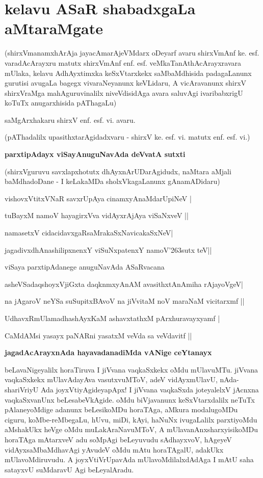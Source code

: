 \setcounter{chapter}{3}
\chapter{kelavu ASaR shabadxgaLa aMtaraMgate}

(shirxVmanamxhArAja jayacAmarAjeVMdarx oDeyarf avaru shirxVmAnf ke. esf. varadAcArayxru matutx shirxVmAnf enf. esf. veMkaTanAthAcArayxravara mUlaka, kelavu AdhAyxtimxka keSxVtarxkekx saMbaMdhisida padagaLanunx gurutisi avugaLa bagegx vivaraNeyanunx keVLidaru, A vicAravanunx shirxV shirxVraMga mahAguruvinalilx niveVdisidAga avara saluvAgi ivaribabxrigU koTuTx anugarxhisida pAThagaLu)

saMgArxhakaru shirxV enf. esf. vi. avaru.

(pAThadalilx upasithxtarAgidadxvaru - shirxV ke. esf. vi. matutx enf. esf. vi.)

\noindent
{\bf\large{parxtipAdayx viSayAnuguNavAda deVvatA sutxti}}\label{page128}

(shirxVguruvu savxlapxhotutx dhAyxnArUDarAgidudx, naMtara aMjali baMdhadoDane - I keLakaMDa sholxVkagaLanunx gAnamADidaru)

\begin{description}
\item[(1)] vishovxVtitxVNaR savxrUpAya cinamxyAnaMdarUpiNeV |\label{128}
\item  tuBayxM namoV hayagirxVva vidAyxrAjAya viSaNxveV ||
\item[(2)] namasetxV cidacidavxgaRsaMrakaSxNavicakaSxNeV|\label{128}
\item  jagadivxdhAnashilipxnenxY viSuNxpatenxY namoV\char'263sutx teV||
\end{description}

viSaya parxtipAdanege anuguNavAda ASaRvacana
\begin{description}
\item[(3)] asheVSadaqshoyxVjiGxta daqknmxyAnAM avasithxtAnAmiha rAjayoVgeV|\label{128}
\item  na jAgaroV neYSa suSupitxBAvoV na jiVvitaM noV maraNaM vicitarxmf ||
\item[(4)] UdhavxRmUlamadhashAyxKaM ashavxtathxM pArxhuravayxyamf |\label{128}
\item  CaMdAMsi yasayx paNARni yasatxM veVda sa veVdavitf ||
\end{description}

\noindent
{\bf\large{jagadAcArayxnAda hayavadanadiMda vANige ceYtanayx}}\label{page128}

beLavaNigeyalilx horaTiruva I jiVvana vaqkaSxkekx oMdu mUlavuMTu. jiVvana vaqkaSxkekx mUlavAdayAva vasutxvuMToV, adeV vidAyxmUlavU, nAda-shariVriyU Ada joyxVtiyAgideyapApx! I jiVvana vaqkaSxda joteyalelxV jAcnxna vaqkaSxvanUnx beLesabeVkAgide. oMdu biVjavanunx keSxVtarxdalilx neTuTx pAlaneyoMdige adanunx beLesikoMDu horaTAga, aMkura modalugoMDu ciguru, koMbe-reMbegaLu, hUvu, miDi, kAyi, haNuNx ivugaLalilx parxtiyoMdu aMshakUkx heVge oMdu muLakAraNavuMToV, A mUlavanAnxsharxyisikoMDu horaTAga mAtarxveV adu soMpAgi beLeyuvudu sAdhayxvoV, hAgeyeV vidAyxsaMbaMdhavAgi yAvudeV oMdu mAtu horaTAgalU, adakUkx mUlavoMdiruvudu. A joyxVtiVrUpavAda mUlavoMdilalxdAdAga I mAtU saha satayxvU suMdaravU Agi beLeyalAradu.

